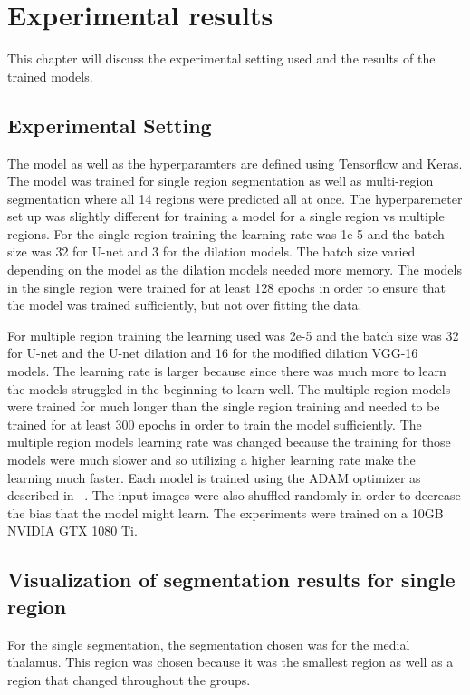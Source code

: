 \chapter{Experimental results}
    This chapter will discuss the experimental setting used and the results of the trained models.
\section{Experimental Setting}
    The model as well as the hyperparamters are defined using Tensorflow and Keras. 
    The model was trained for single region segmentation as well as multi-region segmentation where all 14 regions were predicted all at once.
    The hyperparemeter set up was slightly different for training a model for a single region vs multiple regions. 
    For the single region training the learning rate was 1e-5 and the batch size was 32 for U-net and 3 for the dilation models. 
    The batch size varied depending on the model as the dilation models needed more memory.  
    The models in the single region were trained for at least 128 epochs in order to ensure that the model was trained sufficiently, but not over fitting the data. 
    
    For multiple region training the learning used was 2e-5 and the batch size was 32 for U-net and the U-net dilation and 16 for the modified dilation VGG-16 models. 
    The learning rate is larger because since there was much more to learn the models struggled in the beginning to learn well.
    The multiple region models were trained for much longer than the single region training and needed to be trained for at least 300 epochs in order to train the model sufficiently.
    The multiple region models learning rate was changed because the training for those models were much slower and so utilizing a higher learning rate make the learning much faster.
    Each model is trained using the ADAM optimizer as described in ~\cite{Kingma2014AdamAM}. 
    The input images were also shuffled randomly in order to decrease the bias that the model might learn. 
    The experiments were trained on a 10GB NVIDIA GTX 1080 Ti. 
    


\section{Visualization of segmentation results for single region}
    For the single segmentation, the segmentation chosen was for the medial thalamus. 
    This region was chosen because it was the smallest region as well as a region that changed throughout the groups.

